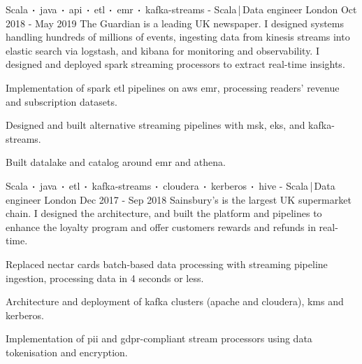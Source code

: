 \begin{cventries}
    \cventry
    {Scala$\sqbig$java$\sqbig$api$\sqbig$etl$\sqbig$emr$\sqbig$kafka-streams}
    { - Scala\,|\,Data engineer}
    {London}
    {Oct 2018 - May 2019}
    {The Guardian is a leading UK newspaper. I designed systems handling hundreds of millions of events, ingesting data from kinesis streams into elastic search via logstash, and kibana for monitoring and observability. I designed and deployed spark streaming processors to extract real-time insights.}
    {
        \begin{cvitems}
            \item{Implementation of spark etl pipelines on aws emr, processing readers' revenue and subscription datasets.}
            \item{Designed and built alternative streaming pipelines with msk, eks, and kafka-streams.}
            \item{Built datalake and catalog around emr and athena.}
        \end{cvitems}
    }

    \cventry
    {Scala$\sqbig$java$\sqbig$etl$\sqbig$kafka-streams$\sqbig$cloudera$\sqbig$kerberos$\sqbig$hive}
    { - Scala\,|\,Data engineer}
    {London}
    {Dec 2017 - Sep 2018}
    {Sainsbury's is the largest UK supermarket chain. I designed the architecture, and built the platform and pipelines to enhance the loyalty program and offer customers rewards and refunds in real-time.}
    {
        \begin{cvitems}
            \item{Replaced nectar cards batch-based data processing with streaming pipeline ingestion, processing data in 4 seconds or less.}
            \item{Architecture and deployment of kafka clusters (apache and cloudera), kms and kerberos.}
            \item{Implementation of pii and gdpr-compliant stream processors using data tokenisation and encryption.}
        \end{cvitems}
    }


\end{cventries}
